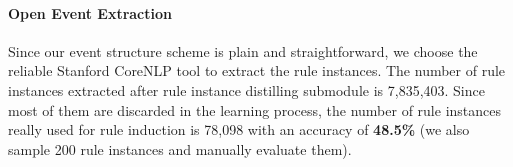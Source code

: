 

\paragraph{Open Event Extraction}
Since our event structure scheme is plain and straightforward, we choose the reliable Stanford CoreNLP tool to extract the rule instances.
The number of rule instances extracted after rule instance distilling submodule is 7,835,403. Since most of them are discarded in the learning process, the number of rule instances really used for rule induction is 78,098 with an accuracy of \textbf{48.5\%} (we also sample 200 rule instances and manually evaluate them).

